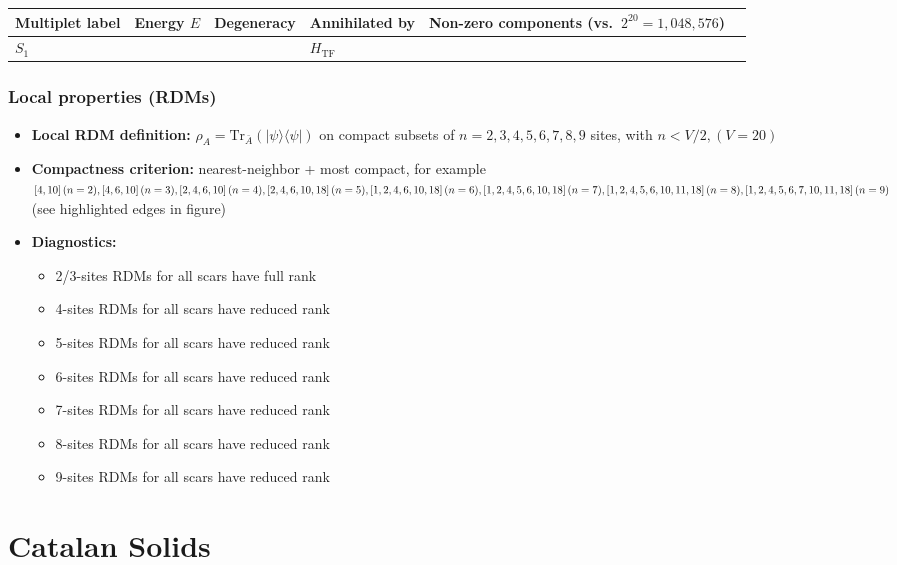 \documentclass[11pt,a4paper]{article}
\newcommand{\Htf}{H_{\mathrm{TF}}}
\begin{document}
\begin{center}
\begin{tabular}{L{3.5cm} C{2.2cm} C{2.2cm} C{2.2cm} C{3.0cm} C{3.2cm}}
\toprule
\textbf{Multiplet label} & \textbf{Energy $E$} & \textbf{Degeneracy} & \textbf{Annihilated by} & \textbf{Non-zero components (vs.\ $2^{20} = 1,048,576$)} \\
\midrule
$S_1$ &  & & $\Htf$ & \\
\bottomrule
\end{tabular}
\end{center}

\subsubsection*{Local properties (RDMs)}

\begin{itemize}[leftmargin=1.5em]
  \item \textbf{Local RDM definition:} $\rho_A=\mathrm{Tr}_{\bar A}(|\psi\rangle\langle\psi|)$ on compact subsets of $n=2,3,4,5,6,7,8,9$ sites, with $n < V/2, (V=20)$
  \item \textbf{Compactness criterion:} nearest-neighbor + most compact, for example $[4,10] \, (n = 2), [4,6,10] \, (n = 3), [2,4,6,10] \,  (n = 4), [2,4,6,10,18] \, (n = 5), [1,2,4,6,10,18] \, (n = 6), \newline
   [1,2,4,5,6,10,18] \, (n = 7), [1,2,4,5,6,10,11,18] \, (n = 8), [1,2,4,5,6,7,10,11,18] \, (n = 9)$ (see highlighted edges in figure)
  \item \textbf{Diagnostics:} \begin{itemize} \item 2/3-sites RDMs for all scars have full rank \item 4-sites RDMs for all scars have reduced rank \item 5-sites RDMs for all scars have reduced rank\item 6-sites RDMs for all scars have reduced rank
  \item 7-sites RDMs for all scars have reduced rank \item 8-sites RDMs for all scars have reduced rank \item 9-sites RDMs for all scars have reduced rank\end{itemize}
\end{itemize}


\section*{Catalan Solids}
\end{document}
